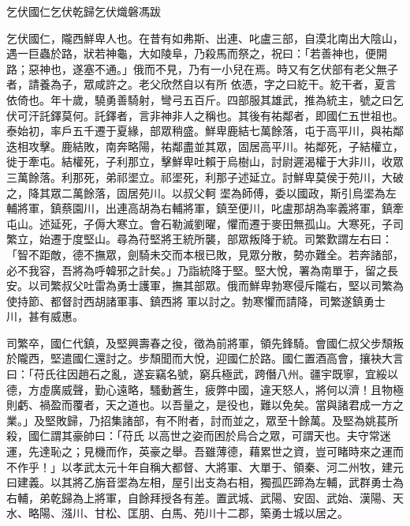
\begin{pinyinscope}
乞伏國仁乞伏乾歸乞伏熾磐馮跋



 乞伏國仁，隴西鮮卑人也。在昔有如弗斯、出連、叱盧三部，自漠北南出大陰山，遇一巨蟲於路，狀若神龜，大如陵阜，乃殺馬而祭之，祝曰：「若善神也，便開路；惡神也，遂塞不通。」俄而不見，乃有一小兒在焉。時又有乞伏部有老父無子者，請養為子，眾咸許之。老父欣然自以有所
 依憑，字之曰紇干。紇干者，夏言依倚也。年十歲，驍勇善騎射，彎弓五百斤。四部服其雄武，推為統主，號之曰乞伏可汗託鐸莫何。託鐸者，言非神非人之稱也。其後有祐鄰者，即國仁五世祖也。泰始初，率戶五千遷于夏緣，部眾稍盛。鮮卑鹿結七萬餘落，屯于高平川，與祐鄰迭相攻擊。鹿結敗，南奔略陽，祐鄰盡並其眾，固居高平川。祐鄰死，子結權立，徙于牽屯。結權死，子利那立，擊鮮卑吐賴于烏樹山，討尉遲渴權于大非川，收眾三萬餘落。利那死，弟祁埿立。祁埿死，利那子述延立。討鮮卑莫侯于苑川，大破之，降其眾二萬餘落，固居苑川。以叔父軻
 埿為師傅，委以國政，斯引烏埿為左輔將軍，鎮蔡園川，出連高胡為右輔將軍，鎮至便川，叱盧那胡為率義將軍，鎮牽屯山。述延死，子傉大寒立。會石勒滅劉曜，懼而遷于麥田無孤山。大寒死，子司繁立，始遷于度堅山。尋為苻堅將王統所襲，部眾叛降于統。司繁歎謂左右曰：「智不距敵，德不撫眾，劍騎未交而本根已敗，見眾分散，勢亦難全。若奔諸部，必不我容，吾將為呼韓邪之計矣。」乃詣統降于堅。堅大悅，署為南單于，留之長安。以司繁叔父吐雷為勇士護軍，撫其部眾。俄而鮮卑勃寒侵斥隴右，堅以司繁為使持節、都督討西胡諸軍事、鎮西將
 軍以討之。勃寒懼而請降，司繁遂鎮勇士川，甚有威惠。



 司繁卒，國仁代鎮，及堅興壽春之役，徵為前將軍，領先鋒騎。會國仁叔父步頹叛於隴西，堅遣國仁還討之。步頹聞而大悅，迎國仁於路。國仁置酒高會，攘袂大言曰：「苻氏往因趙石之亂，遂妄竊名號，窮兵極武，跨僭八州。疆宇既寧，宜綏以德，方虛廣威聲，勤心遠略，騷動蒼生，疲弊中國，違天怒人，將何以濟！且物極則虧、禍盈而覆者，天之道也。以吾量之，是役也，難以免矣。當與諸君成一方之業。」及堅敗歸，乃招集諸部，有不附者，討而並之，眾至十餘萬。及堅為姚萇所殺，國仁謂其豪帥曰：「苻氏
 以高世之姿而困於烏合之眾，可謂天也。夫守常迷運，先達恥之；見機而作，英豪之舉。吾雖薄德，藉累世之資，豈可睹時來之運而不作乎！」以孝武太元十年自稱大都督、大將軍、大單于、領秦、河二州牧，建元曰建義。以其將乙旃音埿為左相，屋引出支為右相，獨孤匹蹄為左輔，武群勇士為右輔，弟乾歸為上將軍，自餘拜授各有差。置武城、武陽、安固、武始、漢陽、天水、略陽、漒川、甘松、匡朋、白馬、苑川十二郡，築勇士城以居之。




\end{pinyinscope}
